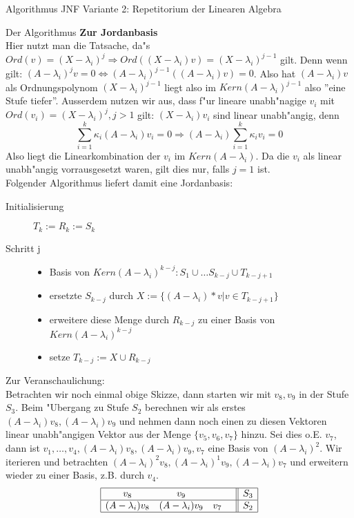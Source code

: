 \documentclass[a4paper]{article}
\begin{document}
\begin{section}{Algorithmus JNF Variante 2: Repetitorium der Linearen Algebra}
\begin{subsection}{Der Algorithmus}
\textbf{Zur Jordanbasis}\\
Hier nutzt man die Tatsache, da"s $Ord(v) = (X-\lambda_i)^j \Rightarrow Ord((X-\lambda_i) v)= (X-\lambda_i)^{j-1}$ gilt. Denn wenn gilt: $(A-\lambda_i)^j v=0 \Leftrightarrow (A-\lambda_i)^{j-1}((A-\lambda_i)v)=0$. Also hat $(A-\lambda_i)v$ als Ordnungspolynom $(X-\lambda_i)^{j-1}$ liegt also im $Kern(A-\lambda_i)^{j-1}$ also ''eine Stufe tiefer''. Ausserdem nutzen wir aus, dass f"ur lineare unabh"nagige $v_i$ mit $Ord(v_i)=(X-\lambda_i)^j, j > 1$ gilt: $(X-\lambda_i)v_i$ sind linear unabh"angig, denn
$$ \sum_{i=1}^k \kappa_i (A-\lambda_i) v_i = 0 \Rightarrow (A-\lambda_i) \sum_{i=1}^k \kappa_i v_i = 0 $$
Also liegt die Linearkombination der $v_i$ im $Kern(A-\lambda_i)$. Da die $v_i$ als linear unabh"angig vorrausgesetzt waren, gilt dies nur, falls $j=1$ ist. \\
Folgender Algorithmus liefert damit eine Jordanbasis:
\begin{description}
\item[Initialisierung] $T_k:=R_k:=S_k$
\item[Schritt j] 
\begin{itemize}
\item Basis von $Kern(A-\lambda_i)^{k-j}: S_1 \cup \ldots S_{k-j} \cup T_{k-j+1}$ 
\item ersetzte $S_{k-j}$ durch $X:=\{(A-\lambda_i) * v | v \in T_{k-j+1}\}$
\item erweitere diese Menge durch $R_{k-j}$ zu einer Basis von $Kern(A-\lambda_i)^{k-j}$
\item setze $T_{k-j}:=X \cup R_{k-j}$ 
\end{itemize}
\end{description}
Zur Veranschaulichung: \\
Betrachten wir noch einmal obige Skizze, dann starten wir mit $v_8, v_9$ in der Stufe $S_3$. Beim "Ubergang zu Stufe $S_2$ berechnen wir als erstes $(A-\lambda_i) v_8, (A-\lambda_i) v_9$ und nehmen dann noch einen zu diesen Vektoren  linear unabh"angigen Vektor  aus der Menge $\{v_5, v_6, v_7\}$ hinzu. Sei dies o.E. $v_7$, dann ist $v_1, \ldots, v_4, (A-\lambda_i) v_8, (A-\lambda_i) v_9,v_7$ eine Basis von $(A-\lambda_i)^2$. Wir iterieren und betrachten $(A-\lambda_i)^2 v_8, (A-\lambda_i)^1 v_9, (A-\lambda_i) v_7$ und erweitern wieder zu einer Basis, z.B. durch $v_4$.
$$\begin{array}{|cccc||c|}\hline
v_8                 & v_9                 &                   &     & S_3 \\\hline
(A-\lambda_i) v_8   & (A-\lambda_i) v_9   & v_7               &     & S_2 \\\hline

\end{array}$$
\end{subsection}
\end{section}
\end{document}
